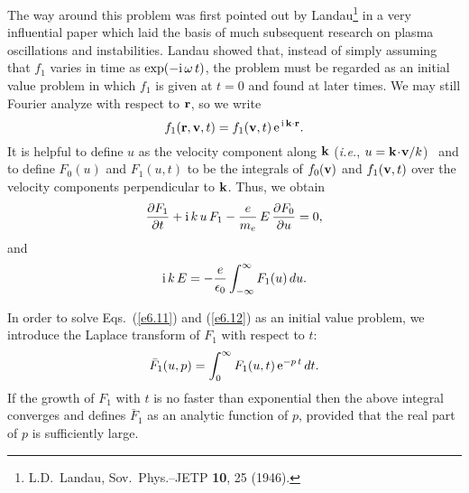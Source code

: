 The way around this problem was first pointed out by Landau\footnote{L.D.~Landau,
Sov.\ Phys.--JETP {\bf 10}, 25 (1946).} in a very
influential paper which laid the basis of much subsequent
research on plasma oscillations and instabilities. Landau showed that,
instead of simply assuming that $f_1$ varies in time as $\exp(-{\rm i}\,\omega\,t)$,
the problem must be regarded as an initial value problem in which $f_1$
is given at $t=0$ and found at later times. 
We may still Fourier analyze with respect to ${\bf r}$, so we write
\begin{equation}
f_1({\bf r}, {\bf v}, t) = f_1({\bf v},t)\,{\rm e}^{\,{\rm i}\,{\bf k}\cdot
{\bf r}}.
\end{equation}
It is helpful to define $u$ as the velocity component along ${\bf k}$ 
({\em i.e.}, $u= {\bf k}\!\cdot\!{\bf v}/k$) \, and to define 
$F_0(u)$ and $F_1(u,t)$ to be the integrals of $f_0({\bf v})$ and
$f_1({\bf v},t)$ over the velocity components perpendicular to ${\bf k}$. 
Thus, we obtain
\begin{equation}\label{e6.11}
\frac{\partial F_1}{\partial t} + {\rm i}\,k\,u\,F_1 - \frac{e}{m_e}\,E\,
\frac{\partial F_0}{\partial u} = 0,
\end{equation}
and
\begin{equation}\label{e6.12}
{\rm i}\,k\,E =-\frac{e}{\epsilon_0} \int_{-\infty}^{\infty} F_1(u)\,du.
\end{equation}

In order to solve Eqs.~(\ref{e6.11}) and (\ref{e6.12}) as an initial value problem, we
introduce the Laplace transform of $F_1$ with respect to $t$:
\begin{equation}
\bar{F}_1(u,p) = \int_0^\infty F_1(u,t)\,{\rm e}^{-p\,t}\,dt.
\end{equation}
If the growth of $F_1$ with $t$ is no faster than exponential then the above
integral converges and defines $\bar{F}_1$ as an analytic function of $p$, provided 
that the real part of $p$ is sufficiently large. 


